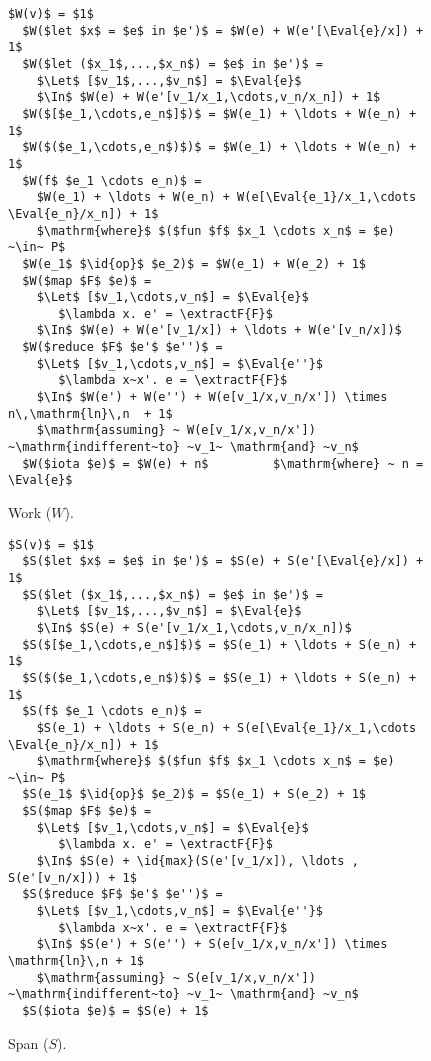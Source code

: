 \documentclass[oneside,11pt]{book}
\begin{document}
\begin{figure}
\begin{lstlisting}[mathescape=true]
  $W(v)$ = $1$
  $W($let $x$ = $e$ in $e')$ = $W(e) + W(e'[\Eval{e}/x]) + 1$
  $W($let ($x_1$,...,$x_n$) = $e$ in $e')$ =
    $\Let$ [$v_1$,...,$v_n$] = $\Eval{e}$
    $\In$ $W(e) + W(e'[v_1/x_1,\cdots,v_n/x_n]) + 1$
  $W($[$e_1,\cdots,e_n$]$)$ = $W(e_1) + \ldots + W(e_n) + 1$
  $W($($e_1,\cdots,e_n$)$)$ = $W(e_1) + \ldots + W(e_n) + 1$
  $W(f$ $e_1 \cdots e_n)$ =
    $W(e_1) + \ldots + W(e_n) + W(e[\Eval{e_1}/x_1,\cdots \Eval{e_n}/x_n]) + 1$
    $\mathrm{where}$ $($fun $f$ $x_1 \cdots x_n$ = $e) ~\in~ P$
  $W(e_1$ $\id{op}$ $e_2)$ = $W(e_1) + W(e_2) + 1$
  $W($map $F$ $e)$ =
    $\Let$ [$v_1,\cdots,v_n$] = $\Eval{e}$
       $\lambda x. e' = \extractF{F}$
    $\In$ $W(e) + W(e'[v_1/x]) + \ldots + W(e'[v_n/x])$
  $W($reduce $F$ $e'$ $e'')$ =
    $\Let$ [$v_1,\cdots,v_n$] = $\Eval{e''}$
       $\lambda x~x'. e = \extractF{F}$
    $\In$ $W(e') + W(e'') + W(e[v_1/x,v_n/x']) \times n\,\mathrm{ln}\,n  + 1$
    $\mathrm{assuming} ~ W(e[v_1/x,v_n/x']) ~\mathrm{indifferent~to} ~v_1~ \mathrm{and} ~v_n$
  $W($iota $e)$ = $W(e) + n$         $\mathrm{where} ~ n = \Eval{e}$
\end{lstlisting}

\caption{Work ($W$).}
\label{fig:work}
\end{figure}

\begin{figure}
\begin{lstlisting}[mathescape=true]
  $S(v)$ = $1$
  $S($let $x$ = $e$ in $e')$ = $S(e) + S(e'[\Eval{e}/x]) + 1$
  $S($let ($x_1$,...,$x_n$) = $e$ in $e')$ =
    $\Let$ [$v_1$,...,$v_n$] = $\Eval{e}$
    $\In$ $S(e) + S(e'[v_1/x_1,\cdots,v_n/x_n])$
  $S($[$e_1,\cdots,e_n$]$)$ = $S(e_1) + \ldots + S(e_n) + 1$
  $S($($e_1,\cdots,e_n$)$)$ = $S(e_1) + \ldots + S(e_n) + 1$
  $S(f$ $e_1 \cdots e_n)$ =
    $S(e_1) + \ldots + S(e_n) + S(e[\Eval{e_1}/x_1,\cdots \Eval{e_n}/x_n]) + 1$
    $\mathrm{where}$ $($fun $f$ $x_1 \cdots x_n$ = $e) ~\in~ P$
  $S(e_1$ $\id{op}$ $e_2)$ = $S(e_1) + S(e_2) + 1$
  $S($map $F$ $e)$ =
    $\Let$ [$v_1,\cdots,v_n$] = $\Eval{e}$
       $\lambda x. e' = \extractF{F}$
    $\In$ $S(e) + \id{max}(S(e'[v_1/x]), \ldots , S(e'[v_n/x])) + 1$
  $S($reduce $F$ $e'$ $e'')$ =
    $\Let$ [$v_1,\cdots,v_n$] = $\Eval{e''}$
       $\lambda x~x'. e = \extractF{F}$
    $\In$ $S(e') + S(e'') + S(e[v_1/x,v_n/x']) \times \mathrm{ln}\,n + 1$
    $\mathrm{assuming} ~ S(e[v_1/x,v_n/x']) ~\mathrm{indifferent~to} ~v_1~ \mathrm{and} ~v_n$
  $S($iota $e)$ = $S(e) + 1$
\end{lstlisting}

\caption{Span ($S$).}
\label{fig:span}
\end{figure}
\end{document}
